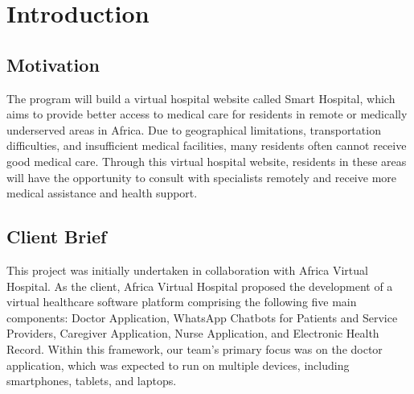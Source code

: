 %
%
\chapter{Introduction}
\label{chap:intro}


\section{Motivation}
\label{sec:sec01}

The program will build a virtual hospital website called Smart Hospital, which aims to provide better access to medical care for residents in remote or medically underserved areas in Africa. Due to geographical limitations, transportation difficulties, and insufficient medical facilities, many residents often cannot receive good medical care. Through this virtual hospital website, residents in these areas will have the opportunity to consult with specialists remotely and receive more medical assistance and health support.


\section{Client Brief}
\label{sec:sec02}

This project was initially undertaken in collaboration with Africa Virtual Hospital. As the client, Africa Virtual Hospital proposed the development of a virtual healthcare software platform comprising the following five main components: Doctor Application, WhatsApp Chatbots for Patients and Service Providers, Caregiver Application, Nurse Application, and Electronic Health Record. Within this framework, our team's primary focus was on the doctor application, which was expected to run on multiple devices, including smartphones, tablets, and laptops.


